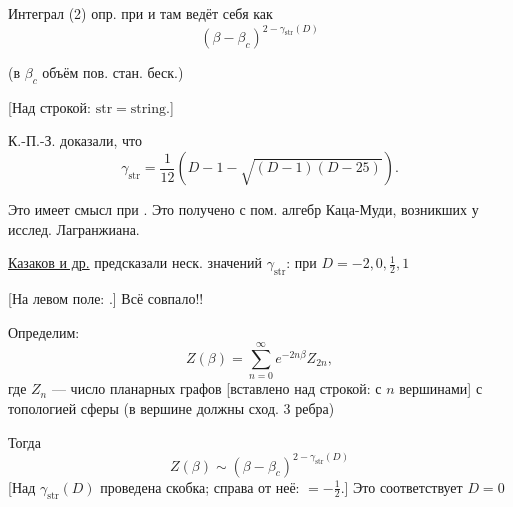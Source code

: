 




Интеграл (2) опр. при
и там ведёт себя как
\begin{equation*}
(\beta-\beta_c)^{2-\gamma_{\mathrm{str}}(D)}
\tag{3}
\end{equation*}

(в $\beta_c$ объём пов. стан. беск.)

[Над строкой: $\mathrm{str}=\mathrm{string}$.]

К.-П.-З. доказали, что
\begin{equation*}
\gamma_{\mathrm{str}}=\frac{1}{12}
\left(D-1-\sqrt{(D-1)(D-25)}\right).
\tag{4}
\end{equation*}

Это имеет смысл при
.
Это получено с пом. алгебр Каца-Муди, возникших у исслед.
Лагранжиана.

\underline{Казаков и др.} предсказали неск. значений $\gamma_{\mathrm{str}}$:
при $D=-2,0,\frac12,1$

[На левом поле:
.]
Всё совпало!!

Определим:
\begin{equation*}
Z(\beta)=\sum_{n=0}^{\infty}e^{-2n\beta}Z_{2n},
\tag{5}
\end{equation*}
где $Z_n$ — число планарных графов
[вставлено над строкой: с $n$ вершинами]
с топологией сферы
(в вершине должны сход. 3 ребра)

Тогда
\begin{equation*}
Z(\beta)\sim(\beta-\beta_c)^{2-\gamma_{\mathrm{str}}(D)}
\tag{6}
\end{equation*}
[Над $\gamma_{\mathrm{str}}(D)$ проведена скобка; справа от неё: $=-\frac12$.]
Это соответствует $D=0$

